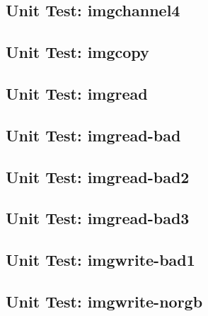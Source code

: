 \subsection*{Unit Test: imgchannel4}

 \clearpage
\subsection*{Unit Test: imgcopy}

 \clearpage
\subsection*{Unit Test: imgread}

 \clearpage
\subsection*{Unit Test: imgread-bad}

 \clearpage
\subsection*{Unit Test: imgread-bad2}

 \clearpage
\subsection*{Unit Test: imgread-bad3}

 \clearpage
\subsection*{Unit Test: imgwrite-bad1}

 \clearpage
\subsection*{Unit Test: imgwrite-norgb}

 \clearpage
